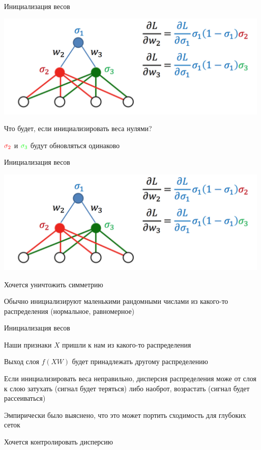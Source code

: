 \documentclass[notes,12pt, aspectratio=169]{beamer}
\newenvironment{wideitemize}{\itemize\addtolength{\itemsep}{10pt}}{\enditemize}
\begin{document}
\begin{frame}{Инициализация весов}
\begin{center}
	\includegraphics[width=.6\linewidth]{init1.png}
\end{center}
\begin{wideitemize}
	\item  Что будет, если инициализировать веса нулями?  \pause 
	\item  ${\color{red} \sigma_2 }$ и ${\color{green} \sigma_3 }$  будут обновляться одинаково
\end{wideitemize}
\end{frame}


\begin{frame}{Инициализация весов}
\begin{center}
\includegraphics[width=.6\linewidth]{init1.png}
\end{center}
\begin{wideitemize}
\item  Хочется уничтожить симметрию
\item  Обычно инициализируют маленькими рандомными числами из какого-то распределения (нормальное, равномерное)
\end{wideitemize}
\end{frame}


\begin{frame}{Инициализация весов}
\begin{wideitemize}
\item Наши признаки $X$ пришли к нам из какого-то распределения 
\item Выход слоя $f(XW)$ будет принадлежать другому распределению 
\item Если инициализировать веса неправильно, дисперсия распределения може от слоя к слою затухать (сигнал будет теряться) либо наоброт, возрастать (сигнал будет рассеиваться)
\item Эмпирически было выяснено, что это может портить сходимость для глубоких сеток
\item  \alert{Хочется контролировать дисперсию} 
\end{wideitemize}
\end{frame}
\end{document}
